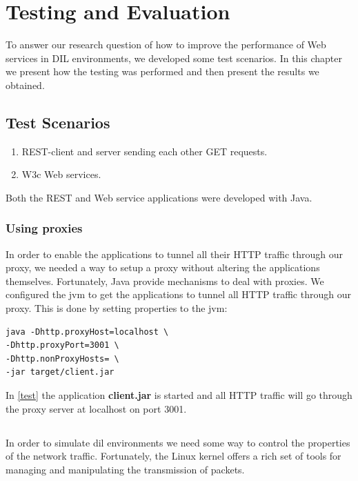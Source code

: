 \chapter{Testing and Evaluation}

To answer our research question of how to improve the performance of Web
services in DIL environments, we developed some test scenarios. In this chapter
we present how the testing was performed and then present the results we
obtained.

\section{Test Scenarios}
\begin{enumerate}
    \item REST-client and server sending each other GET requests.
    \item W3c Web services.
\end{enumerate}

Both the REST and Web service applications were developed with Java.

\subsection{Using proxies}

In order to enable the applications to tunnel all their HTTP traffic through our
proxy, we needed a way to setup a proxy without altering the applications
themselves. Fortunately, Java provide mechanisms to deal with
proxies\cite{oracle-proxy}. We configured the \gls{jvm} to get the applications
to tunnel all HTTP traffic through our proxy. This is done by setting properties
to the \gls{jvm}:


\begin{lstlisting}[frame=single, caption="Setting a proxy on the \gls{jvm}", label=test]
java -Dhttp.proxyHost=localhost \
-Dhttp.proxyPort=3001 \
-Dhttp.nonProxyHosts= \
-jar target/client.jar
\end{lstlisting}

In \cref{test} the application \textbf{client.jar} is started and all HTTP
traffic will go through the proxy server at localhost on port 3001.


\section{\glsentrylong{netem}}

In order to simulate \gls{dil} environments we need some way to control the
properties of the network traffic. Fortunately, the Linux kernel offers a rich
set of tools for managing and manipulating the transmission of packets.

